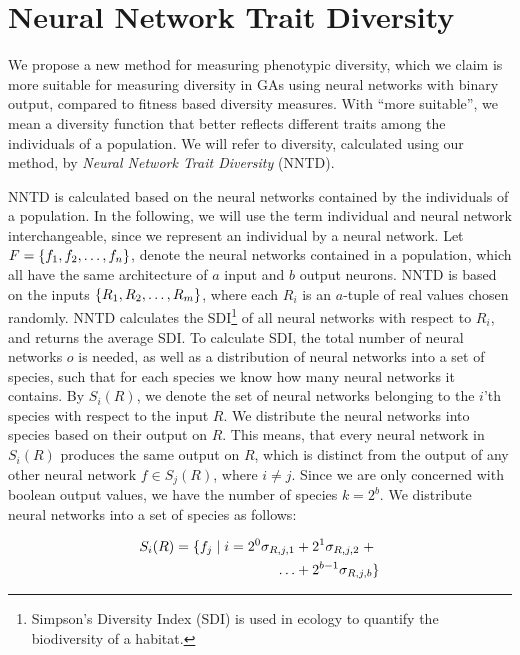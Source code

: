 \section{Neural Network Trait Diversity}
We propose a new method for measuring phenotypic diversity, which we claim is more suitable for measuring diversity in GAs using neural networks with binary output, compared to fitness based diversity measures. With ``more suitable'', we mean a diversity function that better reflects different traits among the individuals of a population. We will refer to diversity, calculated using our method, by \emph{Neural Network Trait Diversity} (NNTD).

NNTD is calculated based on the neural networks contained by the individuals of a population. 
In the following, we will use the term individual and neural network interchangeable, since we represent an individual by a neural network. 
Let $F = \{ f_1, f_2, \dots, f_n \}$, denote the neural networks contained in a population, which all have the same architecture of $a$ input and $b$ output neurons. 
NNTD is based on the inputs $\{ R_1, R_2, \dots, R_m \}$, where each $R_i$ is an $a$-tuple of real values chosen randomly.
NNTD calculates the SDI\footnote{Simpson's Diversity Index (SDI) is used in ecology to quantify the biodiversity of a habitat.} of all neural networks with respect to $R_i$, and returns the average SDI.
To calculate SDI, the total number of neural networks $o$ is needed, as well as a distribution of neural networks into a set of species, such that for each species we know how many neural networks it contains.
By $S_i(R)$, we denote the set of neural networks belonging to the $i$'th species with respect to the input $R$.
We distribute the neural networks into species based on their output on $R$. This means, that every neural network in $S_i(R)$ produces the same output on $R$, which is distinct from the output of any other neural network $f \in S_j(R)$, where $i \neq j$.
Since we are only concerned with boolean output values, we have the number of species $k = 2^b$. 
We distribute neural networks into a set of species as follows:

\begin{equation*}\label{eq:species}
  \begin{split}
    S_i(R) = \{ f_j \mid i = 2^0\sigma_{R,j,1} & + 2^1\sigma_{R,j,2}\; + \\
  \dots & + 2^{b-1}\sigma_{R,j,b} \}
  \end{split}
\end{equation*}

